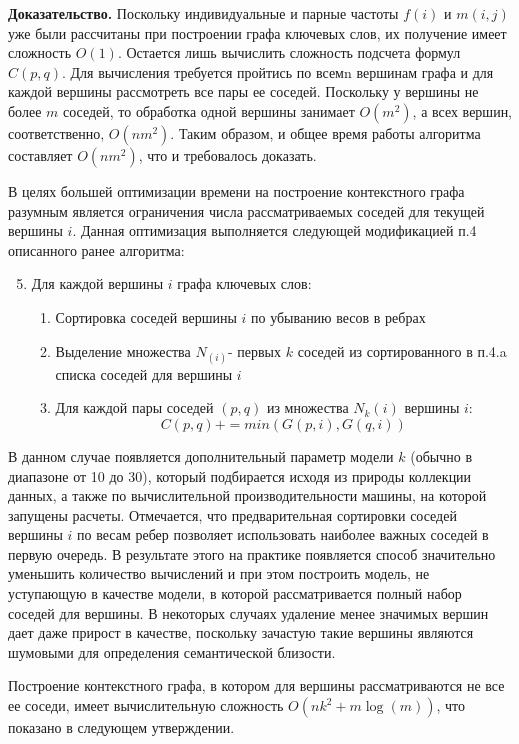 \textbf{Доказательство.} Поскольку индивидуальные и парные частоты $f(i)$ и $m(i,j)$  уже были рассчитаны при построении графа ключевых слов, их получение имеет сложность $O(1)$.  Остается лишь вычислить сложность подсчета формул $C(p,q)$. Для вычисления требуется пройтись по всемn вершинам графа и для каждой вершины рассмотреть все пары ее соседей. Поскольку у вершины не более $m$ соседей, то обработка одной вершины занимает $O(m^2)$, а всех вершин, соответственно, $O(nm^2)$. Таким образом, и общее время работы алгоритма составляет $O(nm^2)$, что и требовалось доказать.

В целях большей оптимизации времени на построение контекстного графа разумным является ограничения числа рассматриваемых соседей для текущей вершины $i$. Данная оптимизация выполняется следующей модификацией п.4 описанного ранее алгоритма:

\begin{enumerate}
  \setcounter{enumi}{4}
  \item Для каждой вершины $i$ графа ключевых слов:
      \begin{enumerate}
          \item Сортировка соседей вершины $i$ по убыванию весов в ребрах
          \item Выделение множества $N_(i)$- первых $k$ соседей из сортированного в п.4.a списка соседей для вершины $i$
          \item Для каждой пары соседей $(p,q)$ из множества $N_k(i)$ вершины $i$:
              $$ C(p, q) \mathrel{{+}{=}} min(G(p,i), G(q,i)) $$
      \end{enumerate}
\end{enumerate}

В данном случае появляется дополнительный параметр модели $k$ (обычно в диапазоне от 10 до 30), который подбирается исходя из природы коллекции данных, а также по вычислительной производительности машины, на которой запущены расчеты. Отмечается, что предварительная сортировки соседей вершины $i$ по весам ребер позволяет использовать наиболее важных соседей в первую очередь. В результате этого на практике появляется способ значительно уменьшить количество вычислений и при этом построить модель, не уступающую в качестве модели, в которой рассматривается полный набор соседей для вершины. В некоторых случаях удаление менее значимых вершин дает даже прирост в качестве, поскольку зачастую такие вершины являются шумовыми для определения семантической близости.

Построение контекстного графа, в котором для вершины рассматриваются не все ее соседи, имеет вычислительную сложность $O(nk^2+m\log(m))$, что показано в следующем утверждении.


